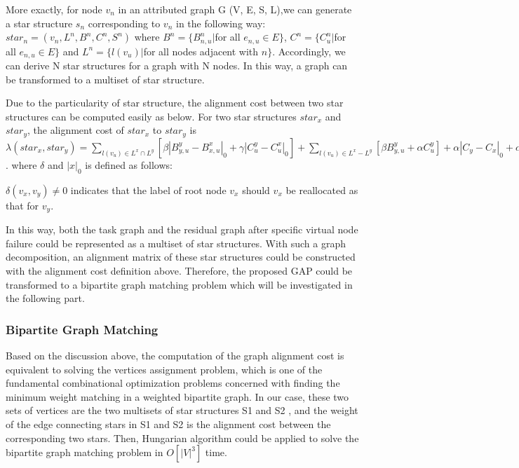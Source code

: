 More exactly, for node $v_n$ in an attributed graph G (V, E, S, L),we can generate a star structure $s_n$ corresponding to $v_n$ in the following way: $star_n=(v_n,L^n,B^n,C^n,S^n)$ where $B^n=\{B^n_{n,u}|$for all $e_{n,u}\in E\}$, $C^n=\{C^n_{u}|$for all $e_{n,u}\in E\}$ and $L^n=\{l(v_u)|$for all nodes  adjacent with $n \}$. Accordingly, we can derive N star structures for a graph with N nodes. In this way, a graph can be transformed to a multiset of star structure.

Due to the particularity of star structure, the alignment cost between two star structures can be computed easily as below. For two star structures $star_x$ and $star_y$, the alignment cost of $star_x$ to $star_y$ is $\lambda(star_x,star_y)=\sum\limits_{l(v_u)\in L^x \cap L^y}[\beta|B^y_{y,u}-B^x_{x,u}|_0+\gamma |C^y_u-C^x_u|_0]+\sum\limits_{l(v_u)\in L^x - L^y}[\beta B^y_{y,u}+\alpha C^y_u]+\alpha|C_y-C_x|_0+\alpha * \delta(v_x,v_y)$. where $\delta$ and $|x|_0$ is defined as follows:

$\delta(v_x,v_y)\neq 0$ indicates that the label of root node $v_x$ should $v_x$ be reallocated as that for $v_y$.

In this way, both the task graph and the residual graph after specific virtual node failure could be represented as a multiset of star structures. With such a graph decomposition, an alignment matrix of these star structures could be constructed with the alignment cost definition above. Therefore, the proposed GAP
could be transformed to a bipartite graph matching problem which will be investigated in the following part.

\subsubsection{Bipartite Graph Matching}
Based on the discussion above, the computation of the graph alignment cost is equivalent to solving the vertices assignment problem, which is one
of the fundamental combinational optimization problems concerned with finding the minimum weight matching in a weighted bipartite graph. In our case, these two sets of vertices are the two multisets of star structures S1 and S2 , and the weight of the edge connecting stars in S1 and S2 is the alignment cost between the
corresponding two stars. Then, Hungarian algorithm could be applied to solve the bipartite graph matching problem in $O[|V |^3 ]$ time.




